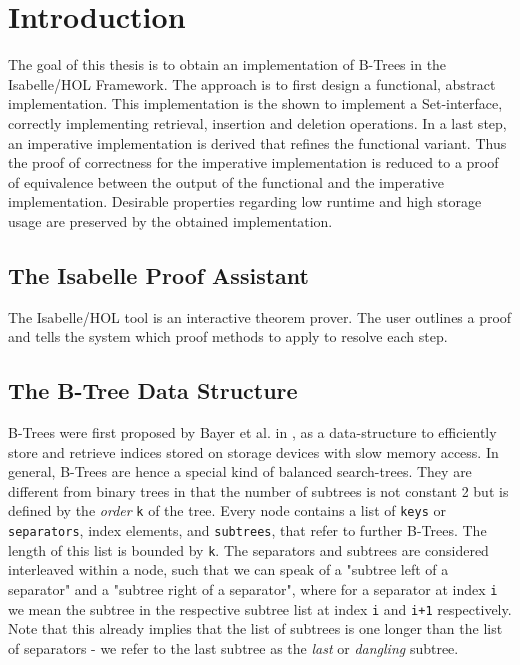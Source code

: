 
\chapter{Introduction}\label{chapter:introduction}

The goal of this thesis is to obtain an implementation of B-Trees in the Isabelle/HOL Framework.
The approach is to first design a functional, abstract implementation.
This implementation is the shown to implement a Set-interface,
correctly implementing retrieval, insertion and deletion operations.
In a last step, an imperative implementation is derived that
refines the functional variant.
Thus the proof of correctness for the imperative implementation
is reduced to a proof of equivalence between the output of the
functional and the imperative implementation.
Desirable properties regarding low runtime and high storage usage
are preserved by the obtained implementation.

\section{The Isabelle Proof Assistant}

The Isabelle/HOL tool is an interactive theorem prover.
The user outlines a proof and tells the system which proof methods to apply to
resolve each step.

\section{The B-Tree Data Structure}

B-Trees were first proposed by Bayer et al. in \parencite{DBLP:journals/acta/BayerM72},
as a data-structure to efficiently store and retrieve indices stored on storage devices
with slow memory access.
In general, B-Trees are hence a special kind of balanced search-trees.
They are different from binary trees in that the number of subtrees is not constant 2
but is defined by the \textit{order} \texttt{k} of the tree.
Every node contains a list of \texttt{keys} or \texttt{separators}, index elements, and \texttt{subtrees},
that refer to further B-Trees.
The length of this list is bounded by \texttt{k}.
The separators and subtrees are considered interleaved within a node,
such that we can speak of a "subtree left of a separator" and a "subtree right of a separator",
where for a separator at index \texttt{i} we mean the subtree in the respective
subtree list at index \texttt{i} and \texttt{i+1} respectively.
Note that this already implies that the list of subtrees is one
longer than the list of separators - we refer to the last subtree as the \textit{last} or
\textit{dangling} subtree.

